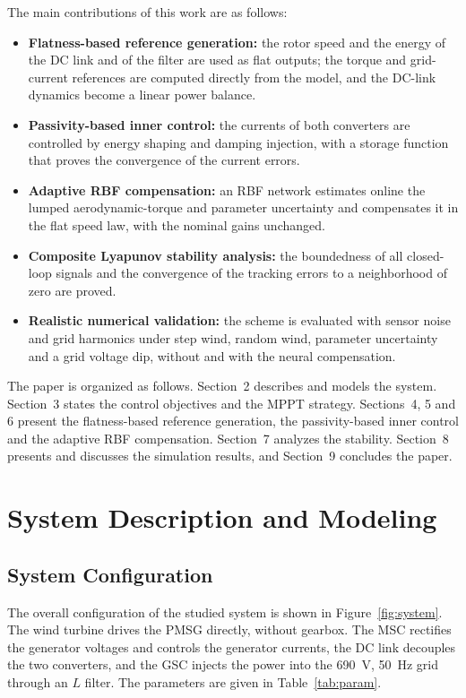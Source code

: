 \documentclass[11pt,a4paper]{article}
\begin{document}
The main contributions of this work are as follows:
\begin{itemize}[leftmargin=*,itemsep=2pt]
\item \textbf{Flatness-based reference generation:} the rotor speed and the energy of the DC link and of
the filter are used as flat outputs; the torque and grid-current references are computed directly from
the model, and the DC-link dynamics become a linear power balance.
\item \textbf{Passivity-based inner control:} the currents of both converters are controlled by energy
shaping and damping injection, with a storage function that proves the convergence of the current errors.
\item \textbf{Adaptive RBF compensation:} an RBF network estimates online the lumped aerodynamic-torque and
parameter uncertainty and compensates it in the flat speed law, with the nominal gains unchanged.
\item \textbf{Composite Lyapunov stability analysis:} the boundedness of all closed-loop signals and the
convergence of the tracking errors to a neighborhood of zero are proved.
\item \textbf{Realistic numerical validation:} the scheme is evaluated with sensor noise and grid harmonics
under step wind, random wind, parameter uncertainty and a grid voltage dip, without and with the neural
compensation.
\end{itemize}

The paper is organized as follows. Section~2 describes and models the system. Section~3 states the
control objectives and the MPPT strategy. Sections~4, 5 and 6 present the flatness-based reference
generation, the passivity-based inner control and the adaptive RBF compensation. Section~7 analyzes the
stability. Section~8 presents and discusses the simulation results, and Section~9 concludes the paper.

\section{System Description and Modeling}
\subsection{System Configuration}
The overall configuration of the studied system is shown in Figure~\ref{fig:system}. The wind turbine
drives the PMSG directly, without gearbox. The MSC rectifies the generator voltages and controls the
generator currents, the DC link decouples the two converters, and the GSC injects the power into the
690~V, 50~Hz grid through an $L$ filter. The parameters are given in Table~\ref{tab:param}.
\end{document}
